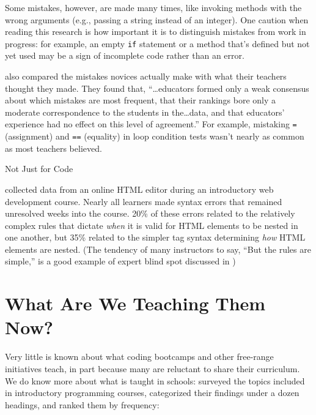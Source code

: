 Some mistakes, however, are made many times, like invoking methods
with the wrong arguments (e.g., passing a string instead of an
integer).  One caution when reading this research is how important it
is to distinguish mistakes from work in progress: for example, an
empty \texttt{if} statement or a method that's defined but not yet
used may be a sign of incomplete code rather than an error.

\cite{Brow2017} also compared the mistakes novices actually make with
what their teachers thought they made.  They found that,
``{\ldots}educators formed only a weak consensus about which mistakes
are most frequent, that their rankings bore only a moderate
correspondence to the students in the{\ldots}data, and that educators'
experience had no effect on this level of agreement.''  For example,
mistaking \texttt{=} (assignment) and \texttt{==} (equality) in loop
condition tests wasn't nearly as common as most teachers believed.

\newpage %

\begin{callout}{Not Just for Code}

  \cite{Park2015} collected data from an online HTML editor during an
  introductory web development course.  Nearly all learners made
  syntax errors that remained unresolved weeks into the course.  20\%
  of these errors related to the relatively complex rules that dictate
  \emph{when} it is valid for HTML elements to be nested in one
  another, but 35\% related to the simpler tag syntax determining
  \emph{how} HTML elements are nested.  (The tendency of many
  instructors to say, ``But the rules are simple,'' is a good example
  of expert blind spot discussed in )

\end{callout}

\section{What Are We Teaching Them Now?}\label{s:pck-now}

Very little is known about what coding bootcamps and other free-range
initiatives teach, in part because many are reluctant to share their
curriculum.  We do know more about what is taught in schools:
\cite{Luxt2017} surveyed the topics included in introductory
programming courses, categorized their findings under a dozen
headings, and ranked them by frequency:

